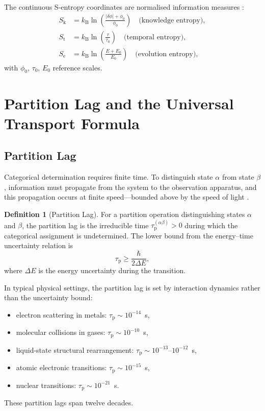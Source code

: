 \documentclass[twocolumn,10pt,a4paper]{article}
\theoremstyle{definition}
\newtheorem{definition}[theorem]{Definition}
\theoremstyle{remark}
\newcommand{\kB}{k_{\mathrm{B}}}
\newcommand{\tauP}{\tau_{\mathrm{p}}}
\newcommand{\Sk}{S_{\mathrm{k}}}
\newcommand{\St}{S_{\mathrm{t}}}
\newcommand{\Se}{S_{\mathrm{e}}}
\begin{document}
The continuous S-entropy coordinates are normalised information measures \citep{shannon1948,jaynes1957}:
\begin{align}
\Sk &= \kB \ln\!\left(\frac{|\delta\phi| + \phi_0}{\phi_0}\right) \quad \text{(knowledge entropy)},\\
\St &= \kB \ln\!\left(\frac{\tau}{\tau_0}\right) \quad \text{(temporal entropy)},\\
\Se &= \kB \ln\!\left(\frac{E + E_0}{E_0}\right) \quad \text{(evolution entropy)},
\end{align}
with $\phi_0$, $\tau_0$, $E_0$ reference scales.

\section{Partition Lag and the Universal Transport Formula}
\label{sec:partition_lag}

\subsection{Partition Lag}

Categorical determination requires finite time. To distinguish state $\alpha$ from state $\beta$, information must propagate from the system to the observation apparatus, and this propagation occurs at finite speed---bounded above by the speed of light \citep{jackson1999}.

\begin{definition}[Partition Lag]
\label{def:partition_lag}
For a partition operation distinguishing states $\alpha$ and $\beta$, the partition lag is the irreducible time $\tauP^{(\alpha\beta)} > 0$ during which the categorical assignment is undetermined. The lower bound from the energy--time uncertainty relation \citep{mandelstam1945,heisenberg1927} is
\begin{equation}
\tauP \geq \frac{\hbar}{2 \Delta E},
\label{eq:lag_bound}
\end{equation}
where $\Delta E$ is the energy uncertainty during the transition.
\end{definition}

In typical physical settings, the partition lag is set by interaction dynamics rather than the uncertainty bound:
\begin{itemize}[leftmargin=1.2em,nosep]
\item electron scattering in metals: $\tauP \sim 10^{-14}$~s,
\item molecular collisions in gases: $\tauP \sim 10^{-10}$~s,
\item liquid-state structural rearrangement: $\tauP \sim 10^{-13}$--$10^{-12}$~s,
\item atomic electronic transitions: $\tauP \sim 10^{-15}$~s,
\item nuclear transitions: $\tauP \sim 10^{-21}$~s.
\end{itemize}
These partition lags span twelve decades.
\end{document}
